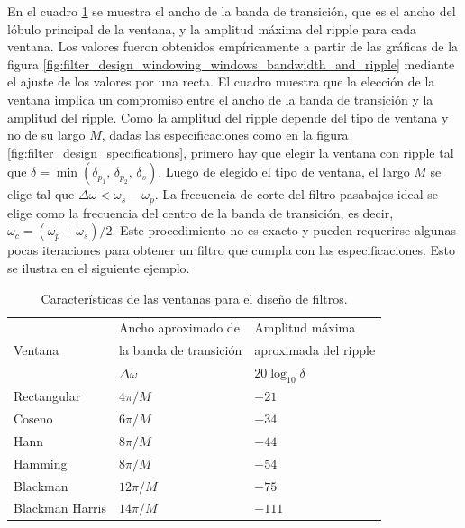 \documentclass[a4paper]{report}
\begin{document}
En el cuadro \ref{tab:filter_design_windowing_windows_bandwidth_and_ripple} se muestra el ancho de la banda de transición, que es el ancho del lóbulo principal de la ventana, y la amplitud máxima del ripple para cada ventana. Los valores fueron obtenidos empíricamente a partir de las gráficas de la figura \ref{fig:filter_design_windowing_windows_bandwidth_and_ripple} mediante el ajuste de los valores por una recta. El cuadro muestra que la elección de la ventana implica un compromiso entre el ancho de la banda de transición y la amplitud del ripple. Como la amplitud del ripple depende del tipo de ventana y no de su largo \(M\), dadas las especificaciones como en la figura \ref{fig:filter_design_specifications}, primero hay que elegir la ventana con ripple tal que \(\delta=\min(\delta_{p_1},\,\delta_{p_2},\,\delta_s)\). Luego de elegido el tipo de ventana, el largo \(M\) se elige tal que \(\Delta\omega<\omega_s-\omega_p\). La frecuencia de corte del filtro pasabajos ideal se elige como la frecuencia del centro de la banda de transición, es decir, \(\omega_c=(\omega_p+\omega_s)/2\). Este procedimiento no es exacto y pueden requerirse algunas pocas iteraciones para obtener un filtro que cumpla con las especificaciones. Esto se ilustra en el siguiente ejemplo.
\begin{table}[ht!]
\begin{center}
\begin{tabular}{|>{\centering\arraybackslash}p{4cm}|>{\centering\arraybackslash}p{4cm}|>{\centering\arraybackslash}p{4cm}|}\hline
                      & Ancho aproximado de    & Amplitud máxima       \\
Ventana               & la banda de transición & aproximada del ripple \\
                      & \(\Delta\omega\)       & \(20\log_{10}\delta\) \\ \hline\hline
Rectangular           & \(4\pi/M\)             & \(-21\)               \\ \hline
Coseno                & \(6\pi/M\)             & \(-34\)               \\ \hline
Hann                  & \(8\pi/M\)             & \(-44\)               \\ \hline
Hamming               & \(8\pi/M\)             & \(-54\)               \\ \hline
Blackman              & \(12\pi/M\)            & \(-75\)               \\ \hline
Blackman Harris       & \(14\pi/M\)            & \(-111\)              \\ \hline
\end{tabular}
\end{center}\caption{Características de las ventanas para el diseño de filtros.}\label{tab:filter_design_windowing_windows_bandwidth_and_ripple}
\end{table} 
\end{document}
